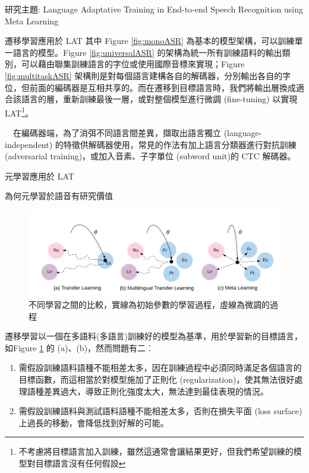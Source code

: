 \documentclass[12pt,UTF8,fntef]{article}
\begin{document}
\begin{section}{研究主題: Language Adaptative Training in End-to-end Speech Recognition using Meta Learning}
\begin{subsection}{遷移學習應用於 LAT}
  其中 Figure \ref{fig:monoASR} 為基本的模型架構，可以訓練單一語言的模型。Figure \ref{fig:universalASR} 的架構為統一所有訓練語料的輸出類別，可以藉由聯集訓練語言的字位或使用國際音標來實現；Figure \ref{fig:multitaskASR} 架構則是對每個語言建構各自的解碼器，分別輸出各自的字位，但前面的編碼器是互相共享的。而在遷移到目標語言時，我們將輸出層換成適合該語言的層，重新訓練最後一層，或對整個模型進行微調 (fine-tuning) 以實現 LAT\footnote{不考慮將目標語言加入訓練，雖然這通常會讓結果更好，但我們希望訓練的模型對目標語言沒有任何假設}。

~~在編碼器端，為了消弭不同語言間差異，擷取出語言獨立 (language-independent) 的特徵供解碼器使用，常見的作法有加上語言分類器進行對抗訓練 (adversarial training)，或加入音素、子字單位 (subword unit)的 CTC 解碼器。
  \end{subsection}

  \begin{subsection}{元學習應用於 LAT}
    \begin{subsubsection}{為何元學習於語音有研究價值}

  \begin{figure}[ht]
      \centering
      \includegraphics[width=0.8\linewidth]{Meta-motivation.png}
      \caption{不同學習之間的比較，實線為初始參數的學習過程，虛線為微調的過程}
      \label{fig:motivation}
  \end{figure}

  遷移學習以一個在多語料(多語言)訓練好的模型為基準，用於學習新的目標語言，如Figure \ref{fig:motivation} 的 (a)、(b)，然而問題有二︰
      \begin{enumerate}[itemsep=-1mm]
        \item 需假設訓練語料語種不能相差太多，因在訓練過程中必須同時滿足各個語言的目標函數，而這相當於對模型施加了正則化 (regularization)，使其無法很好處理語種差異過大，導致正則化強度太大，無法達到最佳表現的情況。
        \item 需假設訓練語料與測試語料語種不能相差太多，否則在損失平面 (loss surface) 上過長的移動，會降低找到好解的可能。 
      \end{enumerate}


\end{subsubsection}
\end{subsection}
\end{section}
\end{document}
